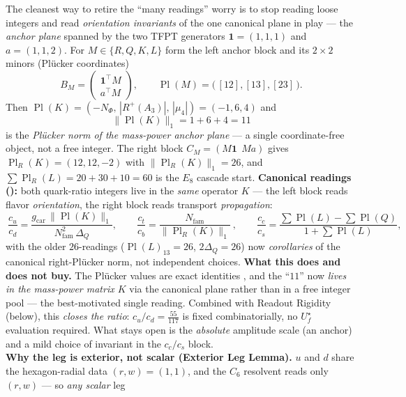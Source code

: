 \documentclass[11pt,a4paper]{article}
\newcommand{\gcar}{g_{\mathrm{car}}}
\newcommand{\Nfam}{N_{\mathrm{fam}}}
\theoremstyle{definition}
\begin{document}
\begin{keybox}
The cleanest way to retire the ``many readings'' worry is to stop reading loose integers and read
\emph{orientation invariants} of the one canonical plane in play --- the \emph{anchor plane} spanned by the
two TFPT generators $\mathbf1=(1,1,1)$ and $a=(1,1,2)$. For $M\in\{R,Q,K,L\}$ form the left anchor block
and its $2{\times}2$ minors (Plücker coordinates)
\[
  B_M=\begin{pmatrix}\mathbf1^{\!\top}\!M\\ a^{\!\top}\!M\end{pmatrix},\qquad
  \operatorname{Pl}(M)=\bigl(\,[12],[13],[23]\,\bigr).
\]
Then $\operatorname{Pl}(K)=(-N_\Phi,\,|R^+(A_3)|,\,|\mu_4|)=(-1,6,4)$ and
\[
  \boxed{\ \|\operatorname{Pl}(K)\|_1=1+6+4=11\ }
\]
is the \emph{Plücker norm of the mass-power anchor plane} --- a single coordinate-free object, not a free
integer. The right block $C_M=(M\mathbf1\,\;M a)$ gives $\operatorname{Pl}_R(K)=(12,12,-2)$ with
$\|\operatorname{Pl}_R(K)\|_1=26$, and
$\sum\operatorname{Pl}_R(L)=20{+}30{+}10=60$ is the $E_8$ cascade start. \textbf{Canonical readings
():} both quark-ratio integers live in the \emph{same} operator $K$ --- the
left block reads flavor \emph{orientation}, the right block reads transport \emph{propagation}:
\[
  \boxed{\ \frac{c_u}{c_d}=\frac{\gcar\,\|\operatorname{Pl}(K)\|_1}{\Nfam^2\,\Delta_Q},\qquad
  \frac{c_t}{c_b}=\frac{\Nfam}{\|\operatorname{Pl}_R(K)\|_1}\ },\qquad
  \frac{c_c}{c_s}=\frac{\sum\operatorname{Pl}(L)-\sum\operatorname{Pl}(Q)}{1+\sum\operatorname{Pl}(L)},
\]
with the older $26$-readings ($\operatorname{Pl}(L)_{13}=26$, $2\Delta_Q=26$) now \emph{corollaries} of
the canonical right-Plücker norm, not independent choices.
\textbf{What this does and does not buy.} The Plücker values are exact identities \mE, and the ``$11$'' now
\emph{lives in the mass-power matrix $K$} via the canonical plane rather than in a free integer pool --- the
best-motivated single reading. Combined with Readout Rigidity (below), this \emph{closes the ratio}:
$c_u/c_d=\tfrac{55}{117}$ is fixed combinatorially, no $U_f^\star$ evaluation required. What stays open is the
\emph{absolute} amplitude scale (an anchor) and a mild choice of invariant in the $c_c/c_s$ block.
\smallskip\\
\noindent\textbf{Why the leg is exterior, not scalar (Exterior Leg Lemma).} $u$ and $d$ share the
hexagon-radial data $(r,w)=(1,1)$, and the $C_6$ resolvent reads only $(r,w)$ --- so \emph{any scalar} leg

\end{keybox}
\end{document}

